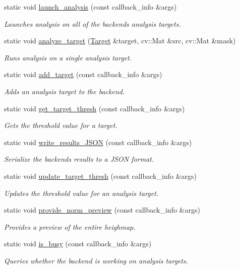 \begin{DoxyCompactItemize}
static void \hyperlink{classbackend_adea4e670e5c1e84d295c5cd03deceb4a}{launch\+\_\+analysis} (const callback\+\_\+info \&args)
\begin{DoxyCompactList}\small\item\em Launches analysis on all of the backend\textquotesingle{}s analysis targets. \end{DoxyCompactList}\item 
static void \hyperlink{classbackend_a23963a7c7e73bba71cbf77e27224efd8}{analyze\+\_\+target} (\hyperlink{structbackend_1_1_target}{Target} \&target, cv\+::\+Mat \&src, cv\+::\+Mat \&mask)
\begin{DoxyCompactList}\small\item\em Runs analysis on a single analysis target. \end{DoxyCompactList}\item 
static void \hyperlink{classbackend_ac981fabc3077c133dca35b5cb7e6f66c}{add\+\_\+target} (const callback\+\_\+info \&args)
\begin{DoxyCompactList}\small\item\em Adds an analysis target to the backend. \end{DoxyCompactList}\item 
static void \hyperlink{classbackend_a827177f07a64774f20057d1704e43a5b}{get\+\_\+target\+\_\+thresh} (const callback\+\_\+info \&args)
\begin{DoxyCompactList}\small\item\em Gets the threshold value for a target. \end{DoxyCompactList}\item 
static void \hyperlink{classbackend_a91fe1ff0bbdc9e29d6958e0cf72d10ba}{write\+\_\+results\+\_\+\+J\+S\+ON} (const callback\+\_\+info \&args)
\begin{DoxyCompactList}\small\item\em Serialize the backend\textquotesingle{}s results to a J\+S\+ON format. \end{DoxyCompactList}\item 
static void \hyperlink{classbackend_a567b1f81aaa959b25ab5448752a5a371}{update\+\_\+target\+\_\+thresh} (const callback\+\_\+info \&args)
\begin{DoxyCompactList}\small\item\em Updates the threshold value for an analysis target. \end{DoxyCompactList}\item 
static void \hyperlink{classbackend_aa4a237c847f3bdc527b7bf01f2fa1974}{provide\+\_\+norm\+\_\+preview} (const callback\+\_\+info \&args)
\begin{DoxyCompactList}\small\item\em Provides a preview of the entire heighmap. \end{DoxyCompactList}\item 
static void \hyperlink{classbackend_aea5762a8de17d93aadb8d1a870e1474d}{is\+\_\+busy} (const callback\+\_\+info \&args)
\begin{DoxyCompactList}\small\item\em Queries whether the backend is working on analysis targets. \end{DoxyCompactList}\end{DoxyCompactItemize}
